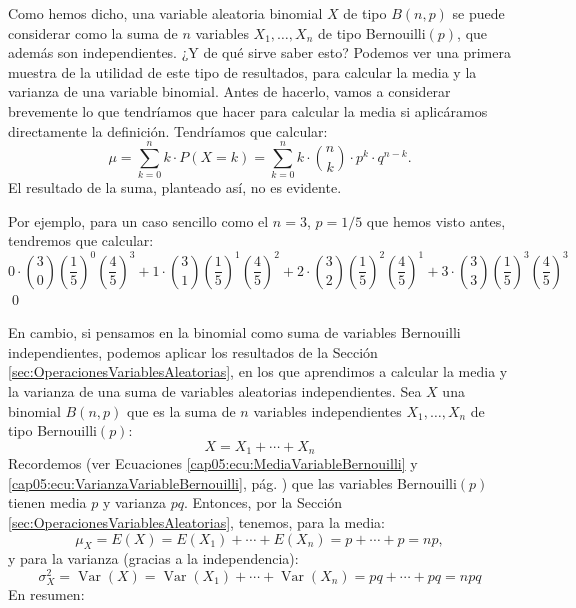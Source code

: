 Como hemos dicho, una variable aleatoria binomial $X$ de tipo $B(n,p)$ se puede considerar como la suma de $n$ variables $X_1,\ldots,X_n$ de tipo Bernouilli$(p)$, que además son independientes. ¿Y de qué sirve saber esto? Podemos ver una primera muestra de la utilidad de este tipo de resultados, para calcular la media y la varianza de una variable binomial. Antes de hacerlo, vamos a considerar brevemente lo que tendríamos que hacer para calcular la media si aplicáramos directamente la definición. Tendríamos que calcular:
\[\mu=\sum_{k=0}^n k\cdot P(X=k)= \sum_{k=0}^n k\cdot\binom{n}{k}\cdot p^k\cdot q^{n-k}.\]
El resultado de la suma, planteado así, no es evidente.
\begin{ejemplo}
\label{cap05:ejem:MediaBinomialCalculoDirecto}
Por ejemplo, para un caso sencillo como el $n=3$, $p=1/5$ que hemos visto antes, tendremos que calcular:
{\small
\[0\cdot\binom{3}{0}\left(\frac{1}{5}\right)^0\left(\frac{4}{5}\right)^{3}+
1\cdot\binom{3}{1}\left(\frac{1}{5}\right)^1\left(\frac{4}{5}\right)^{2}+
2\cdot\binom{3}{2}\left(\frac{1}{5}\right)^2\left(\frac{4}{5}\right)^{1}+
3\cdot\binom{3}{3}\left(\frac{1}{5}\right)^3\left(\frac{4}{5}\right)^{3}
\]
}
\qed
\end{ejemplo}
\noindent En cambio, si pensamos en la binomial como suma de variables Bernouilli independientes, podemos
aplicar los resultados de la Sección \ref{sec:OperacionesVariablesAleatorias}, en los que aprendimos a calcular la media y la varianza de una suma de variables aleatorias independientes.
Sea $X$ una binomial $B(n,p)$ que es la suma de $n$ variables independientes $X_1,\ldots,X_n$ de tipo Bernouilli$(p)$:
\[X=X_1+\cdots+X_n\]
Recordemos (ver Ecuaciones \ref{cap05:ecu:MediaVariableBernouilli} y \ref{cap05:ecu:VarianzaVariableBernouilli}, pág. \pageref{cap05:ecu:VarianzaVariableBernouilli}) que las variables Bernouilli$(p)$ tienen media $p$ y varianza $pq$.
Entonces, por la Sección \ref{sec:OperacionesVariablesAleatorias}, tenemos, para la media:
\[\mu_X=E(X)=E(X_1)+\cdots+E(X_n)=p+\cdots+p=np,\]
y para la varianza (gracias a la independencia):
\[\sigma^2_X=\operatorname{Var}(X)=\operatorname{Var}(X_1)+\cdots+\operatorname{Var}(X_n)=pq+\cdots+pq=npq\]
En resumen:
